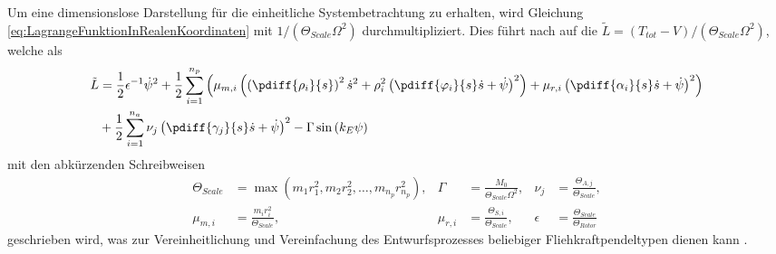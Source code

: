 %
%
%
%
%
%
%
%
%
%
%
%
%
%
%
%
%
%
%
%
%
%
%
%
%
%
%
%
%
%
%
%
%
%
%
%
Um  eine dimensionslose Darstellung für die einheitliche Systembetrachtung zu erhalten, wird Gleichung
\eqref{eq:LagrangeFunktionInRealenKoordinaten} mit $1/({\Theta_{Scale}\Omega^2})$ 
durchmultipliziert.
Dies führt nach  \cite{Mayet:Tautochronic} auf die  
$\tilde{L} = (T_{tot} - V)/(\Theta_{Scale}\Omega^2)$, welche als
%
\begin{equation}
\begin{split}  
	\tilde{L} &= \frac{1}{2} \epsilon^{-1} \dot{\psi}^2 + \frac{1}{2} \sum_{i=1}^{n_p} \left( \mu_{m,i}  \left( \left( \pdiff{\rho_i}{s} \right)^2 \dot{s}^2 + \rho_i^2 \left( \pdiff{\varphi_i}{s} \dot{s} 
																																											+ \dot{\psi} \right)^2 \right) + \mu_{r,i} \left( \pdiff{\alpha_i}{s} \dot{s} + \dot{\psi} \right)^2 \right) \\
						&+ \frac{1}{2} \sum_{i=1}^{n_a} \nu_j \left( \pdiff{\gamma_j}{s} \dot{s} + \dot{\psi} \right)^2  - \Gamma \sin\left( k_E \psi \right) \end{split}
\label{eq:SkalierteLagrangeFunktionfuereinAbsorbersystem}
\end{equation}
%
mit den abkürzenden Schreibweisen
%
\begin{equation}
\begin{split} 	\Theta_{Scale}&= \max \left( m_1 r_1^2, m_2 r_2^2, \dots, m_{n_p} r_{n_p}^2 \right),&		\Gamma&= \frac{M_0}{\Theta_{Scale} \Omega^2},& 			\nu_j&= \frac{\Theta_{A,j}}{\Theta_{Scale}},\\ 
								\mu_{m,i}&= \frac{m_i r_i^2}{\Theta_{Scale}},& 																					\mu_{r,i}&= \frac{\Theta_{S,i}}{\Theta_{Scale}},& 	\epsilon&= \frac{\Theta_{Scale}}{\Theta_{Rotor}} \end{split}
\label{eq:SkalierteLagrangeFunktionAbkuerzungen}
\end{equation}
%
geschrieben wird, was zur Vereinheitlichung und Vereinfachung des Entwurfsprozesses
beliebiger Fliehkraftpendeltypen dienen kann \cite{Mayet:Tautochronic}.
%
%
%
%
%
%
%
